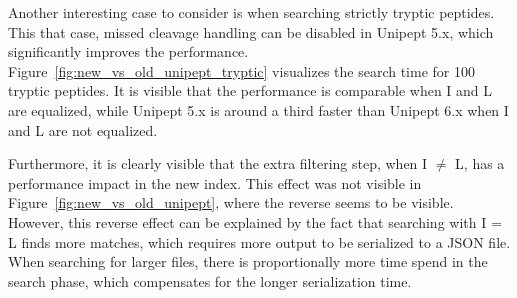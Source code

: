 \documentclass[11pt]{article}
\newenvironment{Figure}
{\par\medskip\noindent\minipage{\linewidth}}
{\endminipage\par\medskip}
\begin{document}
\begin{multicols}{2}
\begin{Figure}
{            }
            \label{fig:new_vs_old_unipept}
        \end{Figure}

        Another interesting case to consider is when searching strictly tryptic peptides.
        This that case, missed cleavage handling can be disabled in Unipept 5.x, which significantly improves the performance.
        Figure~\ref{fig:new_vs_old_unipept_tryptic} visualizes the search time for 100 tryptic peptides.
        It is visible that the performance is comparable when I and L are equalized, while Unipept 5.x is around a third faster than Unipept 6.x when I and L are not equalized.

        Furthermore, it is clearly visible that the extra filtering step, when I $\neq$ L, has a performance impact in the new index.
        This effect was not visible in Figure~\ref{fig:new_vs_old_unipept}, where the reverse seems to be visible.
        However, this reverse effect can be explained by the fact that searching with I = L finds more matches, which requires more output to be serialized to a JSON file.
        When searching for larger files, there is proportionally more time spend in the search phase, which compensates for the longer serialization time.

        \begin{Figure}
            \centering
            \label{fig:new_vs_old_unipept_tryptic}
        \end{Figure}



\end{multicols}
\end{document}
